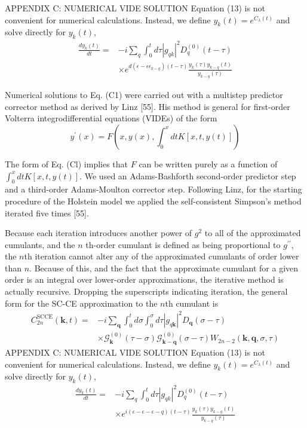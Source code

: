 APPENDIX C: NUMERICAL VIDE SOLUTION
Equation (13) is not convenient for numerical calculations. Instead, we define $y_k(t)=e^{C_\lambda(t)}$ and solve directly for $y_k(t)$,
$$
\begin{aligned}
\frac{d y_k(t)}{d t}= & -i \sum_q \int_0^t d \tau\left|g_{q k}\right|^2 D_q^{(0)}(t-\tau) \\
& \times e^{d\left(\epsilon-\epsilon \epsilon_{k-q}\right)(t-\tau)} \frac{y_k(\tau) y_{k-q}(t)}{y_{k-q}(\tau)}
\end{aligned}
$$

Numerical solutions to Eq. (C1) were carried out with a multistep predictor corrector method as derived by Linz [55]. His method is general for first-order Volterra integrodifferential equations (VIDEs) of the form
$$
y^{\prime}(x)=F\left(x, y(x), \int_0^x d t K[x, t, y(t)]\right)
$$

The form of Eq. (Cl) implies that $F$ can be written purely as a function of $\int_0^x d t K[x, t, y(t)]$. We used an Adams-Bashforth second-order predictor step and a third-order Adams-Moulton corrector step. Following Linz, for the starting procedure of the Holstein model we applied the self-consistent Simpson's method iterated five times [55].

Because each iteration introduces another power of $g^2$ to all of the approximated cumulants, and the $n$ th-order cumulant is defined as being proportional to $g^{\prime \prime}$, the $n$th iteration cannot alter any of the approximated cumulants of order lower than $n$. Because of this, and the fact that the approximate cumulant for a given order is an integral over lower-order approximations, the iterative method is actually recursive. Dropping the superscripts indicating iteration, the general form for the SC-CE approximation to the $n$th cumulant is
$$
\begin{aligned}
C_{2 n}^{\mathrm{SCCE}}(\mathbf{k}, t)= & -i \sum_{\mathbf{q}} \int_0^t d \sigma \int_0^\sigma d \tau\left|g_{q \mathbf{k}}\right|^2 D_{\mathbf{q}}(\sigma-\tau) \\
& \times \mathcal{G}_{\mathbf{k}}^{(0)}(\tau-\sigma) \mathcal{G}_{\mathbf{k}-\mathbf{q}}^{(0)}(\sigma-\tau) W_{2 n-2}(\mathbf{k}, \mathbf{q}, \sigma, \tau)
\end{aligned}
$$
APPENDIX C: NUMERICAL VIDE SOLUTION
Equation (13) is not convenient for numerical calculations. Instead, we define $y_k(t)=e^{C_\lambda(t)}$ and solve directly for $y_k(t)$,
$$
\begin{aligned}
\frac{d y_k(t)}{d t}= & -i \sum_q \int_0^t d \tau\left|g_{q k}\right|^2 D_q^{(0)}(t-\tau) \\
& \times e^{i(\epsilon-\epsilon-\epsilon-q)(t-\tau)} \frac{y_k(\tau) y_{k-q}(t)}{y_{k-q}(\tau)}
\end{aligned}
$$

